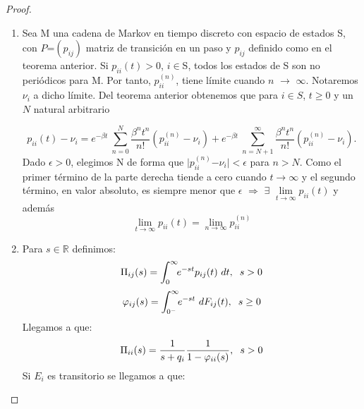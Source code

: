 \documentclass[12pt,a4paper]{article}
\begin{document}
     \begin{proof}
         	\begin{enumerate}
     	
     \item Sea M una cadena de Markov en tiempo discreto con espacio de estados S, con $P$=$(p_{ij})$ matriz de transición en un paso y $p_{ij}$ definido como en el teorema anterior. Si $p_{ii}(t)$$>$$0$, $i$$\in$S, todos los estados de S son no periódicos para M. Por tanto, $p_{ii}^{(n)}$, tiene límite cuando $n$ $\rightarrow$ $\infty$. Notaremos $\nu_{i}$ a dicho límite. Del teorema anterior obtenemos que para $i$$\in$$S$, $t$$\geq$$0$ y un $N$ natural arbitrario 
      
      \begin{equation*}
      p_{ii}(t)-\nu_{i}=e^{-\beta t}\ \sum_{n = 0}^{N}\frac{\beta^{n} t^{n}}{n!}(p_{ii}^{(n)}-\nu_{i})+e^{-\beta t}\ \sum_{n = N+1}^{\infty}\frac{\beta^{n} t^{n}}{n!}(p_{ii}^{(n)}-\nu_{i}).
      \end{equation*}
      Dado $\epsilon$$>$$0$, elegimos N de forma que $\mid$$p_{ii}^{(n)}$$-$$\nu_{i}$$\mid$$<$$\epsilon$ para $n$$>$$N$. Como el primer término de la parte derecha tiende a cero cuando $t$$\rightarrow$$\infty$ y el segundo término, en valor absoluto, es siempre menor que $\epsilon$ $\Longrightarrow$  $\exists$ $\lim\limits_{t\rightarrow \infty} p_{ii}(t)$ y además
      \begin{equation*}
      \lim\limits_{t\rightarrow \infty} p_{ii}(t)= \lim\limits_{n\rightarrow \infty} p_{ii}^{(n)}
      \end{equation*}
      \item Para $s$$\in$$\mathbb{R}$ definimos:
      \begin{equation*}
      \Pi_{ij}(s)=\int_0^\infty\!\!e^{-st}p_{ij}(t)\ dt,  \hspace{0.2cm} s>0
      \end{equation*}
      \begin{equation*}
      \varphi_{ij}(s)=\int_{0^{-}}^\infty\!\!e^{-st}\ dF_{ij}(t),  \hspace{0.2cm} s \geq 0
      \end{equation*}
      Llegamos a que:
      \begin{equation*}
      \Pi_{ii}(s)=\frac{1}{s+q_{i}}\frac{1}{1-\varphi_{ii}(s)},  \hspace{0.2cm} s>0
      \end{equation*}
      Si $E_{i}$ es transitorio se llegamos a que:
      \begin{equation*}

\end{equation*}
\end{enumerate}
\end{proof}
\end{document}
